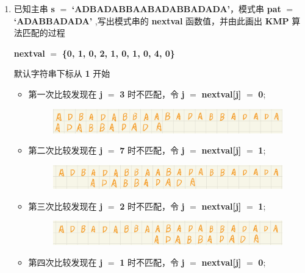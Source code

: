 \begin{enumerate}
\begin{figure}[htbp]
            \end{figure}
        \item 已知主串 \textbf{s} $=$ \textbf{`ADBADABBAABADABBADADA'}，模式串 \textbf{pat} $=$ \textbf{`ADABBADADA'} ,写出模式串的 \textbf{nextval} 函数值，并由此画出 \textbf{KMP} 算法匹配的过程
            \par \textbf{nextval} $=$ \textbf{\{0, 1, 0, 2, 1, 0, 1, 0, 4, 0\}}
            \par 默认字符串下标从 \textbf{1} 开始
            \begin{itemize}
                \item 第一次比较发现在 \textbf{j} $=$ \textbf{3} 时不匹配，令 \textbf{j} $=$ \textbf{nextval[j]} $=$ \textbf{0};
                    \begin{figure}[htbp]
                        \centering
                        \includegraphics*[width = 11cm]{1.1.png}
                    \end{figure}
                \item 第二次比较发现在 \textbf{j} $=$ \textbf{7} 时不匹配，令 \textbf{j} $=$ \textbf{nextval[j]} $=$ \textbf{1};
                    \begin{figure}[htbp]
                        \centering
                        \includegraphics*[width = 11cm]{1.2.png}
                    \end{figure}
                \newpage
                \item 第三次比较发现在 \textbf{j} $=$ \textbf{2} 时不匹配，令 \textbf{j} $=$ \textbf{nextval[j]} $=$ \textbf{1};
                    \begin{figure}[htbp]
                        \centering
                        \includegraphics*[width = 11cm]{1.3.png}
                    \end{figure}
                \item 第四次比较发现在 \textbf{j} $=$ \textbf{1} 时不匹配，令 \textbf{j} $=$ \textbf{nextval[j]} $=$ \textbf{0};
                    \begin{figure}[htbp]

\end{figure}
\end{itemize}
\end{enumerate}

